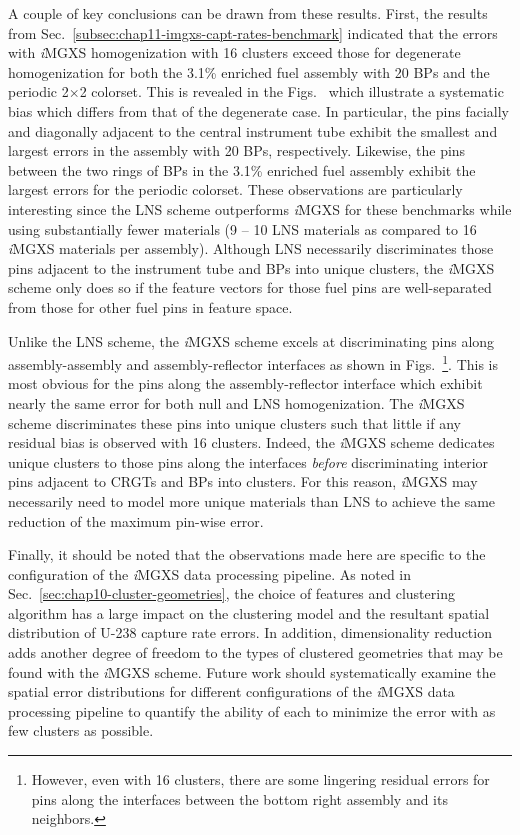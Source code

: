 A couple of key conclusions can be drawn from these results. First, the results from Sec.~\ref{subsec:chap11-imgxs-capt-rates-benchmark} indicated that the errors with \textit{i}\ac{MGXS} homogenization with 16 clusters exceed those for degenerate homogenization for both the 3.1\% enriched fuel assembly with 20 \acp{BP} and the periodic 2$\times$2 colorset. This is revealed in the Figs.~ which illustrate a systematic bias which differs from that of the degenerate case. In particular, the pins facially and diagonally adjacent to the central instrument tube exhibit the smallest and largest errors in the assembly with 20 \acp{BP}, respectively. Likewise, the pins between the two rings of \acp{BP} in the 3.1\% enriched fuel assembly exhibit the largest errors for the periodic colorset. These observations are particularly interesting since the \ac{LNS} scheme outperforms \textit{i}\ac{MGXS} for these benchmarks while using substantially fewer materials (9 -- 10 \ac{LNS} materials as compared to 16 \textit{i}\ac{MGXS} materials per assembly). Although \ac{LNS} necessarily discriminates those pins adjacent to the instrument tube and \acp{BP} into unique clusters, the \textit{i}\ac{MGXS} scheme only does so if the feature vectors for those fuel pins are well-separated from those for other fuel pins in feature space.

Unlike the \ac{LNS} scheme, the \textit{i}\ac{MGXS} scheme excels at discriminating pins along assembly-assembly and assembly-reflector interfaces as shown in Figs.~\footnote{However, even with 16 clusters, there are some lingering residual errors for pins along the interfaces between the bottom right assembly and its neighbors.}. This is most obvious for the pins along the assembly-reflector interface which exhibit nearly the same error for both null and \ac{LNS} homogenization. The \textit{i}\ac{MGXS} scheme discriminates these pins into unique clusters such that little if any residual bias is observed with 16 clusters. Indeed, the \textit{i}\ac{MGXS} scheme dedicates unique clusters to those pins along the interfaces \textit{before} discriminating interior pins adjacent to \acp{CRGT} and \acp{BP} into clusters. For this reason, \textit{i}\ac{MGXS} may necessarily need to model more unique materials than \ac{LNS} to achieve the same reduction of the maximum pin-wise error.

Finally, it should be noted that the observations made here are specific to the configuration of the \textit{i}\ac{MGXS} data processing pipeline. As noted in Sec.~\ref{sec:chap10-cluster-geometries}, the choice of features and clustering algorithm has a large impact on the clustering model and the resultant spatial distribution of U-238 capture rate errors. In addition, dimensionality reduction adds another degree of freedom to the types of clustered geometries that may be found with the \textit{i}\ac{MGXS} scheme. Future work should systematically examine the spatial error distributions for different configurations of the \textit{i}\ac{MGXS} data processing pipeline to quantify the ability of each to minimize the error with as few clusters as possible.

